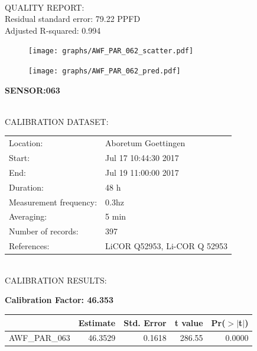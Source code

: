 \documentclass[oneside]{report}
\begin{document}
\hrulefill\\
QUALITY REPORT:\\
Residual standard error: 79.22 PPFD\\
Adjusted R-squared: 0.994



\begin{figure}[H]
  \centering
  \texttt{[image: graphs/AWF\_PAR\_062\_scatter.pdf]}
\end{figure}




\begin{figure}[H]
  \centering
  \texttt{[image: graphs/AWF\_PAR\_062\_pred.pdf]}
\end{figure}

\pagebreak


\begin{center}
\large{\textbf{SENSOR:063}}\\
\end{center}

\hrulefill\\
CALIBRATION DATASET:\\
\begin{table}[h!]
  \centering
  \label{tab:table1}
  \begin{tabular}{ll}
    Location: & Aboretum Goettingen\\ 
    
    
    Start:  & Jul 17 10:44:30 2017 \\
    End:   & Jul 19 11:00:00 2017\\ 
    Duration: & 48 h\\
    Measurement frequency: & 0.3hz\\
    Averaging:  &5 min\\
    Number of records: & 397 \\
    References: & LiCOR Q52953, Li-COR Q 52953 \\
  \end{tabular}
\end{table}

\hrulefill\\
CALIBRATION RESULTS:\\


\begin{center}
\textbf{\large{Calibration Factor: 46.353}}\\
\end{center}
\begin{table}[ht]
\centering
\begin{tabular}{rrrrr}
  \hline
 & Estimate & Std. Error & t value & Pr($>$$|$t$|$) \\ 
  \hline
AWF\_PAR\_063 & 46.3529 & 0.1618 & 286.55 & 0.0000 \\ 
   \hline
\end{tabular}
\end{table}
\end{document}
